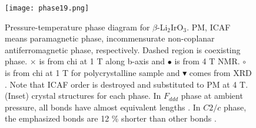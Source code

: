 \begin{figure}[h]
  \centering
  \texttt{[image: phase19.png]}
  \caption{Pressure-temperature phase diagram for $\beta$-Li$_2$IrO$_3$.
  PM, ICAF means paramagnetic phase, incommensurate non-coplanar antiferromagnetic phase, respectively.
  Dashed region is coexisting phase.
  $\times$ is from chi at 1 T along b-axis and $\bullet$ is from 4 T NMR.
  $\circ$ is from chi at 1 T for polycrystalline sample \cite{Majumder2018} and $\blacktriangledown$ comes from XRD \cite{veiga2017pressure}.
  Note that ICAF order is destroyed and substituted to PM at 4 T. (Inset) crystal structures for each phase.
  In $F_{ddd}$ phase at ambient pressure, all bonds have almost equivalent lengths \cite{takayama2015hyperhoneycomb}.
  In $C2/c$ phase, the emphasized bonds are 12 \% shorter than other bonds \cite{veiga2017pressure}.}
  \label{phase}
\end{figure}
